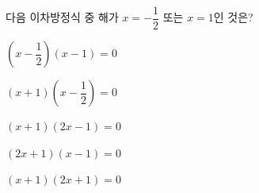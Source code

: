 다음 이차방정식 중 해가 $x=-\dfrac{1}{2}$ 또는 $x=1$인 것은?
\begin{choicesii}{\rule[-3ex]{0pt}{8ex}$\left(x-\dfrac{1}{2}\right)(x-1)=0$}{\rule[-3ex]{0pt}{8ex}$(x+1)\left(x-\dfrac{1}{2}\right)=0$}{\rule[-3ex]{0pt}{8ex}$(x+1)(2x-1)=0$}{\rule[-3ex]{0pt}{8ex}$(2x+1)(x-1)=0$}{\rule[-3ex]{0pt}{8ex}$(x+1)(2x+1)=0$}\end{choicesii}
